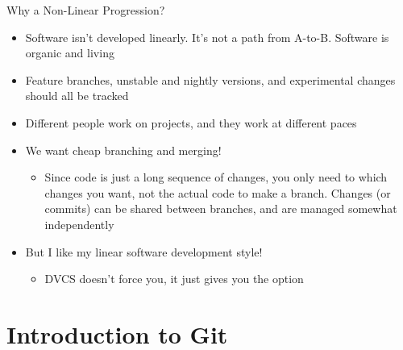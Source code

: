 \documentclass[aspectratio=43]{beamer}
\begin{document}
\begin{frame}{Why a Non-Linear Progression?}
    \begin{itemize}
    \item Software isn't developed linearly. It's not a path from A-to-B.
        Software is organic and living
    \item Feature branches, unstable and nightly versions, and experimental
        changes should all be tracked
    \item Different people work on projects, and they work at different paces
    \item We want cheap branching and merging!
        \begin{itemize}
        \item Since code is just a long sequence of changes, you only need to
            which changes you want, not the actual code to make a branch.
            Changes (or commits) can be shared between branches, and are managed
            somewhat independently
        \end{itemize}
    \item But I like my linear software development style!
        \begin{itemize}
        \item DVCS doesn't force you, it just gives you the option
        \end{itemize}
    \end{itemize}
\end{frame}

\section{Introduction to Git}
\end{document}
